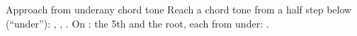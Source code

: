 \begin{patternbox}{Approach from under}{any chord tone}
Reach a chord tone from a half step below (``under''):
, , .
On : the 5th and the root, each from under: .
\patternwhereline
\end{patternbox}
